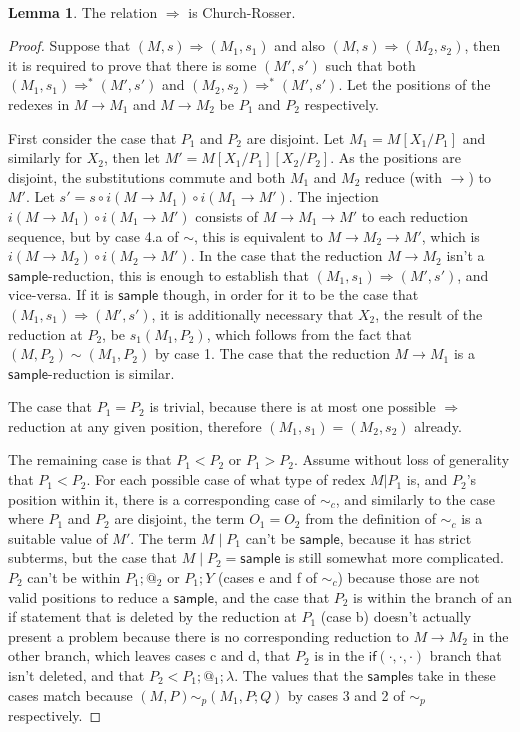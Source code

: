 \documentclass{article}
\newcommand{\tif}[3]{\mathsf{if}(#1, #2, #3)} %
\newcommand{\tsample}{\mathsf{sample}}
\theoremstyle{definition}
\theoremstyle{lemma}
\newtheorem{lemma}{Lemma}
\theoremstyle{remark}
\begin{document}
\paragraph{}
\begin{lemma}
The relation $\Rightarrow$ is Church-Rosser.
\end{lemma}
\begin{proof}
Suppose that $(M,s) \Rightarrow (M_1,s_1)$ and also $(M,s) \Rightarrow (M_2,s_2)$, then it is required to prove that there is some $(M',s')$ such that both $(M_1,s_1) \Rightarrow^* (M',s')$ and $(M_2,s_2) \Rightarrow^* (M',s')$. Let the positions of the redexes in $M \to M_1$ and $M \to M_2$ be $P_1$ and $P_2$ respectively.

First consider the case that $P_1$ and $P_2$ are disjoint. Let $M_1 = M[X_1/P_1]$ and similarly for $X_2$, then let $M' = M[X_1/P_1][X_2/P_2]$. As the positions are disjoint, the substitutions commute and both $M_1$ and $M_2$ reduce (with $\to$) to $M'$. 
Let $s' = s \circ i(M \to M_1) \circ i(M_1 \to M')$. 
The injection $i(M \to M_1) \circ i(M_1 \to M')$ consists of  $M \to M_1 \to M'$ to each reduction sequence, but by case 4.a of $\sim$, this is equivalent to  $M \to M_2 \to M'$, which is $i(M \to M_2) \circ i(M_2 \to M')$. 
In the case that the reduction $M \to M_2$ isn't a $\tsample$-reduction, this is enough to establish that $(M_1, s_1) \Rightarrow (M', s')$, and vice-versa. 
If it is $\tsample$ though, in order for it to be the case that $(M_1, s_1) \Rightarrow (M', s')$, it is additionally necessary that $X_2$, the result of the reduction at $P_2$, be $s_1(M_1, P_2)$, which follows from the fact that $(M, P_2) \sim (M_1, P_2)$ by case 1. 
The case that the reduction $M \to M_1$ is a $\tsample$-reduction is similar.

The case that $P_1 = P_2$ is trivial, because there is at most one possible $\Rightarrow$ reduction at any given position, therefore $(M_1, s_1) = (M_2, s_2)$ already.

The remaining case is that $P_1 < P_2$ or $P_1 > P_2$. 
Assume without loss of generality that $P_1 < P_2$. 
For each possible case of what type of redex $M | P_1$ is, and $P_2$'s position within it, there is a corresponding case of $\sim_c$, and similarly to the case where $P_1$ and $P_2$ are disjoint, the term $O_1 = O_2$ from the definition of $\sim_c$ is a suitable value of $M'$. 
The term $M \mid P_1$ can't be $\tsample$, because it has strict subterms, but the case that $M \mid P_2 = \tsample$ is still somewhat more complicated. 
$P_2$ can't be within $P_1 ; @_2$ or $P_1 ; Y$ (cases e and f of $\sim_c$) because those are not valid positions to reduce a $\tsample$, 
and the case that $P_2$ is within the branch of an if statement that is deleted by the reduction at $P_1$ (case b) doesn't actually present a problem because there is no corresponding reduction to $M \to M_2$ in the other branch, 
which leaves cases c and d, that $P_2$ is in the $\tif{\cdot}{\cdot}{\cdot}$ branch that isn't deleted, and that $P_2 < P_1 ; @_1 ; \lambda$.  
The values that the $\tsample$s take in these cases match because $(M,P) \sim_p (M_1, P;Q)$ by cases 3 and 2 of $\sim_p$ respectively.
\end{proof}
\end{document}
